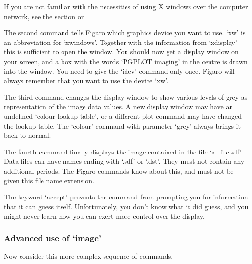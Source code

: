    If you are not familiar with the necessities of using X windows over
   the computer network, see
   {the section on }

   The second command tells Figaro which graphics device you want to
   use. `xw' is an abbreviation for `xwindows'. Together with the
   information from `xdisplay' this is sufficient to open the window.
   You should now get a display window on your screen, and a box with
   the words `PGPLOT imaging' in the centre is drawn into the window.
   You need to give the `idev' command only once. Figaro will always
   remember that you want to use the device `xw'.

   The third command changes the display window to show various levels
   of grey as representation of the image data values. A new display
   window may have an undefined `colour lookup table', or a different
   plot command may have changed the lookup table. The `colour'
   command with parameter `grey' always brings it back to normal.

   The fourth command finally displays the image contained in the file
   `a\_file.sdf'. Data files can have names ending with `.sdf' or
   `.dst'. They must not contain any additional periods. The Figaro
   commands know about this, and must not be given this file name
   extension.

\begin{latexonly}
\begin{figure}[htb]
\begin{center}
\leavevmode{}
\end{center}
\end{figure}
\end{latexonly}

   The keyword `accept' prevents the command from prompting you for
   information that it can guess itself. Unfortunately, you don't know
   what it did guess, and you might never learn how you can exert more
   control over the display.


\subsubsection{\label{lookimagadvanced}Advanced use of `image'}

   Now consider this more complex sequence of commands.

